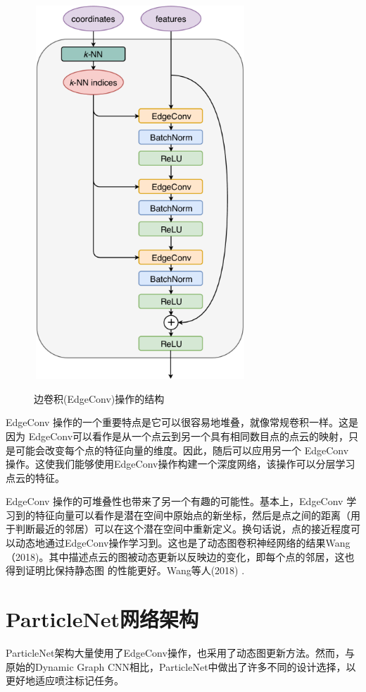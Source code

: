 \begin{figure}[H]
 \centering
 \caption{边卷积(EdgeConv)操作的结构\cite{PaticleNet}}
 \includegraphics[height=14cm, width=8cm]{pictures/edgeconv.png}
 \label{fig:4.1}
\end{figure}

EdgeConv 操作的一个重要特点是它可以很容易地堆叠，就像常规卷积一样。这是因为 EdgeConv可以看作是从一个点云到另一个具有相同数目点的点云的映射，只是可能会改变每个点的特征向量的维度。因此，随后可以应用另一个 EdgeConv 操作。这使我们能够使用EdgeConv操作构建一个深度网络，该操作可以分层学习点云的特征。

EdgeConv 操作的可堆叠性也带来了另一个有趣的可能性。基本上，EdgeConv 学习到的特征向量可以看作是潜在空间中原始点的新坐标，然后是点之间的距离（用于判断最近的邻居）可以在这个潜在空间中重新定义。换句话说，点的接近程度可以动态地通过EdgeConv操作学习到。这也是了动态图卷积神经网络的结果Wang（2018)。其中描述点云的图被动态更新以反映边的变化，即每个点的邻居，这也得到证明比保持静态图 的性能更好。Wang等人(2018) .

\section{ParticleNet网络架构}
ParticleNet架构大量使用了EdgeConv操作，也采用了动态图更新方法。然而，与原始的Dynamic Graph CNN相比，ParticleNet中做出了许多不同的设计选择，以更好地适应喷注标记任务。

